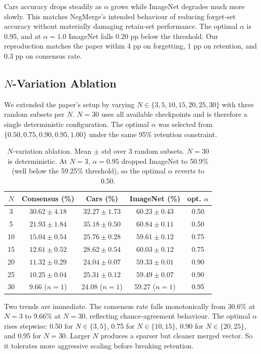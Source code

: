 \documentclass{article}
\begin{document}
Cars accuracy drops steadily as $\alpha$ grows while ImageNet degrades much more slowly. This matches NegMerge's intended behaviour of reducing forget-set accuracy without materially damaging retain-set performance. The optimal $\alpha$ is 0.95, and at $\alpha = 1.0$ ImageNet falls 0.20 pp below the threshold. Our reproduction matches the paper within 4 pp on forgetting, 1 pp on retention, and 0.3 pp on consensus rate.

\subsection{$N$-Variation Ablation}\label{sec:nvar}

We extended the paper's setup by varying $N \in \{3, 5, 10, 15, 20, 25, 30\}$ with three random subsets per $N$. $N = 30$ uses all available checkpoints and is therefore a single deterministic configuration. The optimal $\alpha$ was selected from $\{0.50, 0.75, 0.90, 0.95, 1.00\}$ under the same 95\% retention constraint.

\begin{table}[h]
\caption{$N$-variation ablation. Mean $\pm$ std over 3 random subsets. $N = 30$ is deterministic. At $N = 3$, $\alpha = 0.95$ dropped ImageNet to 50.9\% (well below the 59.25\% threshold), so the optimal $\alpha$ reverts to 0.50.}
\centering
\small
\setlength{\tabcolsep}{4pt}
\begin{tabular}{ccccc}
\toprule
$N$ & Consensus (\%) & Cars (\%) & ImageNet (\%) & opt. $\alpha$ \\
\midrule
3 & $30.62 \pm 4.18$ & $32.27 \pm 1.73$ & $60.23 \pm 0.43$ & 0.50 \\
5 & $21.93 \pm 1.84$ & $35.18 \pm 0.50$ & $60.84 \pm 0.11$ & 0.50 \\
10 & $15.04 \pm 0.54$ & $25.76 \pm 0.28$ & $59.61 \pm 0.12$ & 0.75 \\
15 & $12.61 \pm 0.52$ & $28.62 \pm 0.54$ & $60.03 \pm 0.12$ & 0.75 \\
20 & $11.32 \pm 0.29$ & $24.04 \pm 0.07$ & $59.33 \pm 0.01$ & 0.90 \\
25 & $10.25 \pm 0.04$ & $25.31 \pm 0.12$ & $59.49 \pm 0.07$ & 0.90 \\
30 & 9.66 ($n=1$) & 24.08 ($n=1$) & 59.27 ($n=1$) & 0.95 \\
\bottomrule
\end{tabular}
\end{table}

Two trends are immediate. The consensus rate falls monotonically from 30.6\% at $N=3$ to 9.66\% at $N=30$, reflecting chance-agreement behaviour. The optimal $\alpha$ rises stepwise: 0.50 for $N \in \{3, 5\}$, 0.75 for $N \in \{10, 15\}$, 0.90 for $N \in \{20, 25\}$, and 0.95 for $N=30$. Larger $N$ produces a sparser but cleaner merged vector. So it tolerates more aggressive scaling before breaking retention.
\end{document}
